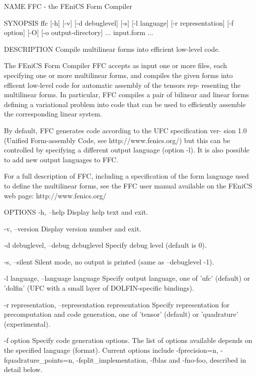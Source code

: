NAME
       FFC - the FEniCS Form Compiler


SYNOPSIS
       ffc [-h] [-v] [-d debuglevel] [-s] [-l language] [-r representation]
       [-f option] [-O] [-o output-directory] ... input.form ...


DESCRIPTION
       Compile multilinear forms into efficient low-level code.

       The FEniCS Form Compiler FFC accepts as input one or more  files,  each
       specifying  one or more multilinear forms, and compiles the given forms
       into efficent low-level code for automatic assembly of the tensors rep-
       resenting  the multilinear forms. In particular, FFC compiles a pair of
       bilinear and linear forms defining a variational problem into code that
       can be used to efficiently assemble the corresponding linear system.

       By  default, FFC generates code according to the UFC specification ver-
       sion 1.0 (Unified Form-assembly Code, see  http://www.fenics.org/)  but
       this  can  be  controlled  by  specifying  a  different output language
       (option -l). It is also possible to add new output languages to FFC.

       For a full description of FFC, including a specification  of  the  form
       language  used to define the multilinear forms, see the FFC user manual
       available on the FEniCS web page: http://www.fenics.org/


OPTIONS
       -h, --help
              Display help text and exit.

       -v, --version
              Display version number and exit.

       -d debuglevel, --debug debuglevel
              Specify debug level (default is 0).

       -s, --silent
              Silent mode, no output is printed (same as --debuglevel -1).

       -l language, --language language
              Specify output language, one of 'ufc' (default) or 'dolfin' (UFC
              with a small layer of DOLFIN-specific bindings).

       -r representation, --representation representation
              Specify  representation  for precomputation and code generation,
              one of 'tensor' (default) or 'quadrature' (experimental).

       -f option
              Specify  code generation options. The list of options available
              depends on the specified language (format). Current options
              include -fprecision=n, -fquadrature_points=n,
              -fsplit_implementation, -fblas and -fno-foo, described in detail
              below.

